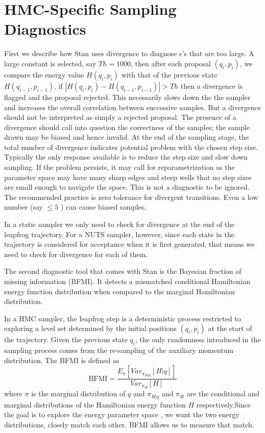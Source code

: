 \documentclass[12pt]{report}
\begin{document}
\section{HMC-Specific Sampling Diagnostics}

First we describe how Stan uses
divergence to diagnose $\epsilon$'s that are too large. A large constant
is selected, say $Th = 1000$, then after each proposal $(q_i,p_i)$, we compare the
energy value $H(q_i,p_i)$ with that of the previous state $H(q_{i-1},p_{i-1})$,
if $|H(q_i,p_i) - H(q_{i-1},p_{i-1})|> Th$ then a divergence is flagged and the
proposal rejected. This necessarily slows down the the sampler and increases the overall correlation between successive samples. But a divergence should not be interpreted as simply a rejected proposal. The presence of a divergence should call into question the correctness of the samples; the sample
drawn may be biased and hence invalid.
 At the end of the sampling stage, the total number of
divergence indicates potential problem with the chosen step size. Typically the
only response available is to reduce the step size and slow down sampling.
If the problem persists, it may call for reparametrization as the parameter
space may have many sharp edges and steep wells that no step sizes are small
enough to navigate the space.  This is not a diagnostic to be ignored. The recommended practice is zero tolerance for divergent transitions. Even a low number (say $\le 5 $ ) can cause biased samples.

In a static sampler we only need to check for divergence at the end of the leapfrog trajectory. For a NUTS sampler, however, since each state in the trajectory is considered for acceptance when it is first generated, that means we need to check for divergence for each of them. 


The second diagnostic tool that comes with Stan is the Bayesian fraction of
missing information (BFMI). It detects a mismatched conditional Hamiltonian
energy function
distribution when compared to the marginal Hamiltonian distribution. 

In a HMC sampler, the leapfrog step is a deterministic process
restricted to exploring a level set determined by the 
initial positions $(q_i,p_i)$ at the start of the trajectory. Given the previous 
state $q_i$, the only randomness introduced in the sampling process comes from the re-sampling of the auxiliary
momentum distribution.  The BFMI is defined as 
\[ \text{BFMI} = \frac{ E_\pi[Var_{\pi_{H|q}}[H|q]]}{Var_{\pi_H}[H]} \]
where $\pi$ is the marginal distribution of $q$ and $\pi_{H|q}$ and $\pi_{H}$
are the conditional and marginal distributions of the Hamiltonian energy
function $H$ respectively.Since the goal is
to explore the energy parameter space , we want the two energy distributions, 
closely match each other. BFMI allows us to measure that match.
\end{document}
